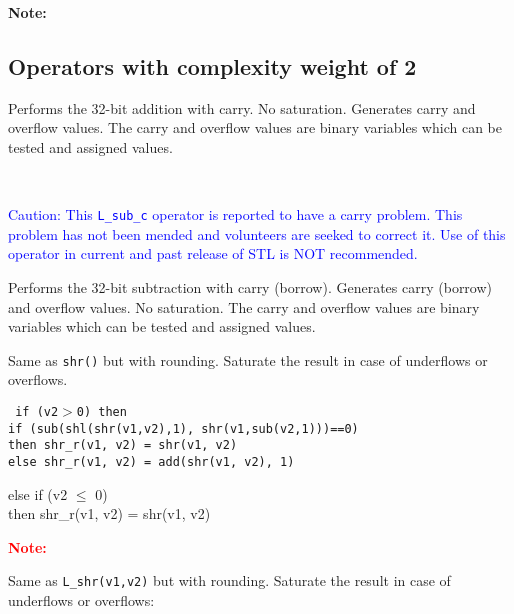 \textbf{Note:} \hfill {}


\subsection{Operators with complexity weight of 2}


Performs the 32-bit addition with carry. No saturation. Generates
carry and overflow values. The carry and overflow values are
binary variables which can be tested and assigned values.

\ \\

\textcolor{blue}{
%
  Caution: This {\tt L\_sub\_c} operator is reported to have a carry
  problem. This problem has not been mended and volunteers are seeked
  to correct it. Use of this operator in current and past release of
  STL is NOT recommended.
%
}

Performs the 32-bit subtraction with carry (borrow). Generates
carry (borrow) and overflow values. No saturation. The carry and
overflow values are binary variables which can be tested and
assigned values.


Same as {\tt shr()} but with rounding. Saturate the result in case of underflows or overflows.

{\tt
{} if (v2$>$0) then\\
    if (sub(shl(shr(v1,v2),1), shr(v1,sub(v2,1)))==0) \\
    then shr\_r(v1, v2) = shr(v1, v2)\\
    else shr\_r(v1, v2) = add(shr(v1, v2), 1)

 else if (v2 $\leq$ 0) \\
    then shr\_r(v1, v2) = shr(v1, v2)}

\textcolor{red} {
\textbf{Note:} \hfill {}
}



Same as {\tt L\_shr(v1,v2)} but with rounding. Saturate the result in case of underflows or overflows:


